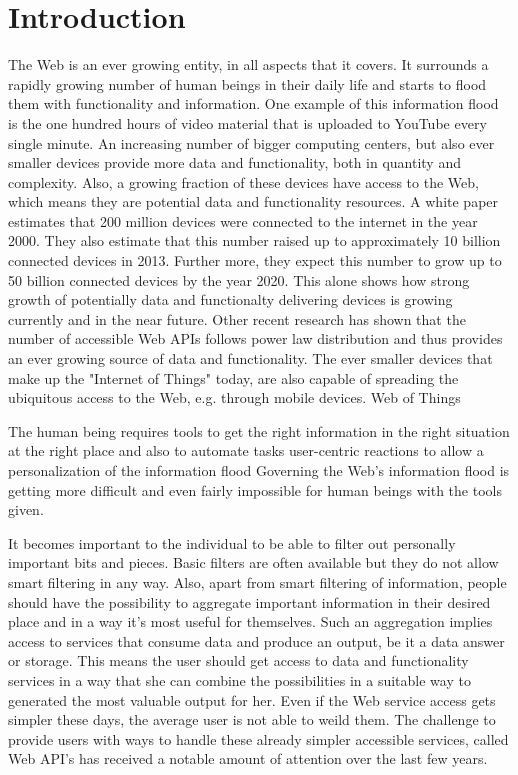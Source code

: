 
\chapter{Introduction}

The Web is an ever growing entity, in all aspects that it covers.
It surrounds a rapidly growing number of human beings in their daily life and starts to flood them with functionality and information.
One example of this information flood is the one hundred hours of video material that is uploaded to \textrm{YouTube\cite{wwwYoutube}} every single minute.
An increasing number of bigger computing centers, but also ever smaller devices provide more data and functionality, both in quantity and complexity.
Also, a growing fraction of these devices have access to the Web, which means they are potential data and functionality resources.
A white paper\cite{citeulike:12243016} estimates that 200 million devices were connected to the internet in the year 2000.
They also estimate that this number raised up to approximately 10 billion connected devices in 2013.
Further more, they expect this number to grow up to 50 billion connected devices by the year 2020.
This alone shows how strong growth of potentially data and functionalty delivering devices is growing currently and in the near future.
Other recent research\cite{conf/icws/HuangFT12}\cite{wwwProgrammableWebResearch} has shown that the number of accessible Web APIs follows power law distribution and thus provides an ever growing source of data and functionality.
The ever smaller devices that make up the "Internet of Things"\cite{Weber2010} today, are also capable of spreading the ubiquitous access to the Web, e.g. through mobile devices.
\textrm{Web of Things}~\cite{Guinard2011WoT}

The human being requires tools to get the right information in the right situation at the right place and also to automate tasks
user-centric reactions to allow a personalization of the information flood
Governing the Web's information flood is getting more difficult and even fairly impossible for human beings with the tools given.


It becomes important to the individual to be able to filter out personally important bits and pieces.
Basic filters are often available but they do not allow smart filtering in any way.
Also, apart from smart filtering of information, people should have the possibility to aggregate important information in their desired place and in a way it's most useful for themselves.
Such an aggregation implies access to services that consume data and produce an output, be it a data answer or storage.
This means the user should get access to data and functionality services in a way that she can combine the possibilities in a suitable way to generated the most valuable output for her.
Even if the Web service access gets simpler these days, the average user is not able to weild them.
The challenge to provide users with ways to handle these already simpler accessible services, called Web API's has received a notable amount of attention over the last few years.

